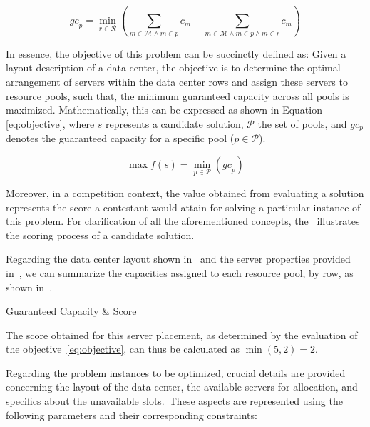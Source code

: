 \begin{equation}
  \label{eq:guaranteed-capacity}
  {gc}_{p} = \min_{r \in \mathcal{R}} \left({\sum_{m \in \mathcal{M} \land m \in p} c_{m}} - {\sum_{ m \in \mathcal{M} \land m \in p \land m \in r} c_{m}}\right)
\end{equation}

In essence, the objective of this problem can be succinctly defined as:
Given a layout description of a data center, the objective is to determine the
optimal arrangement of servers within the data center rows and assign these
servers to resource pools, such that, the minimum guaranteed capacity across all
pools is maximized. Mathematically, this can be expressed as shown in Equation
\ref{eq:objective}, where $s$ represents a candidate solution, $\mathcal{P}$
the set of pools, and $gc_{p}$ denotes the guaranteed capacity for a specific
pool ($p \in \mathcal{P}$).

\begin{equation}
  \label{eq:objective}
  \max f(s) = \min_{p \in \mathcal{P}} \left({gc}_{p}\right)
\end{equation}

Moreover, in a competition context, the value obtained from evaluating a
solution represents the score a contestant would attain for solving a particular
instance of this problem. For clarification of all the aforementioned concepts,
the~ illustrates the scoring process of a candidate
solution.

\begin{example}[Scoring]
  \label{ex:problem-scoring}
  Regarding the data center layout shown
  in~ and the server properties
  provided in~, we can summarize
  the capacities assigned to each resource pool, by row, as shown in~.

  \begin{table}[ht]
    \centering
    
    \caption{Guaranteed Capacity \& Score}
    \label{table:dc-gc-example}
  \end{table}

  The score obtained for this server placement, as determined by the evaluation
  of the objective~\ref{eq:objective}, can thus be calculated as $\min(5, 2) = 2$.
\end{example}

Regarding the problem instances to be optimized, crucial details are provided
concerning the layout of the data center, the available servers for allocation,
and specifics about the unavailable slots.~These aspects are represented using
the following parameters and their corresponding constraints:

